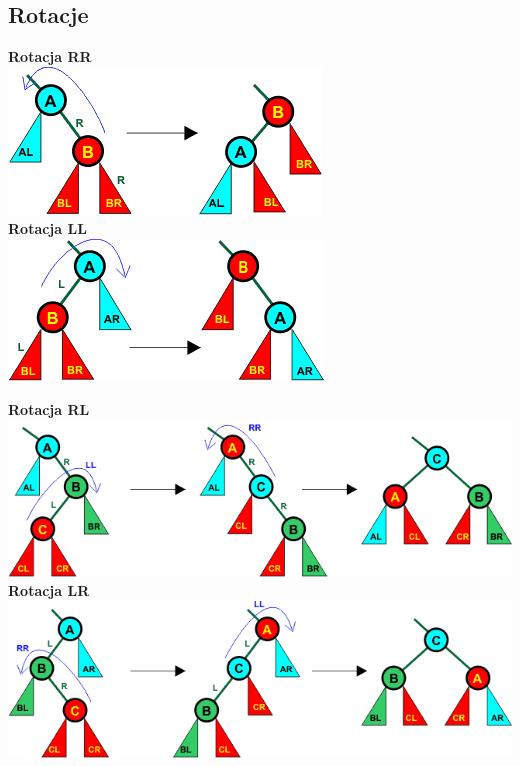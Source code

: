 \documentclass[12pt]{article}
\begin{document}
    \subsection{Rotacje}
    \begin{multicols}{2}
        \textbf{Rotacja RR} \\

        \includegraphics[width=0.8\linewidth]{avl-trees/rr-rotation.png}
        \columnbreak \\
        \textbf{Rotacja LL} \\

        \includegraphics[width=0.8\linewidth]{avl-trees/ll-rotation.png}
    \end{multicols}

    \textbf{Rotacja RL} \\

    \includegraphics[width=\linewidth]{avl-trees/rl-rotation.png} \\

    \textbf{Rotacja LR} \\

    \includegraphics[width=\linewidth]{avl-trees/lr-rotation.png} \\
\end{document}
